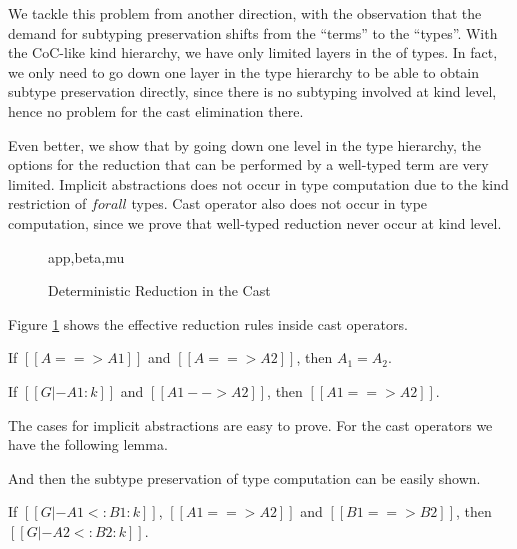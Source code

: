We tackle this problem from another direction, with the observation that the
demand for subtyping preservation shifts from the ``terms'' to the ``types''.
With the CoC-like kind hierarchy, we have only limited layers in the of types.
In fact, we only need to go down one layer in the type hierarchy to be able to
obtain subtype preservation directly, since there is no subtyping involved at kind level,
hence no problem for the cast elimination there.

Even better, we show that by going down one level in the type hierarchy, the options
for the reduction that can be performed by a well-typed term are very limited.
Implicit abstractions does not occur in type computation due to the kind
restriction of $forall$ types. Cast operator also does not occur in type computation,
since we prove that well-typed reduction never occur at kind level.

\begin{figure}
      {app,beta,mu}
    \caption{Deterministic Reduction in the Cast}
    \label{fig:deterministic-reduction}
\end{figure}

Figure \ref{fig:deterministic-reduction} shows the effective reduction rules
inside cast operators.

\begin{lemma}
    If $[[A ==> A1]]$ and $[[A ==> A2]]$,
    then $A_1 = A_2$.
\end{lemma}

\begin{lemma}
    If $[[G |- A1 : k]]$ and $[[A1 --> A2]]$,
    then $[[A1 ==> A2]]$.
\end{lemma}

The cases for implicit abstractions are easy to prove. For the cast operators
we have the following lemma.


And then the subtype preservation of type computation can be easily shown.

\begin{lemma}
    If $[[G |- A1 <: B1 : k]]$, $[[A1 ==> A2]]$ and $[[B1 ==> B2]]$,
    then $[[G |- A2 <: B2 : k]]$.
\end{lemma}

